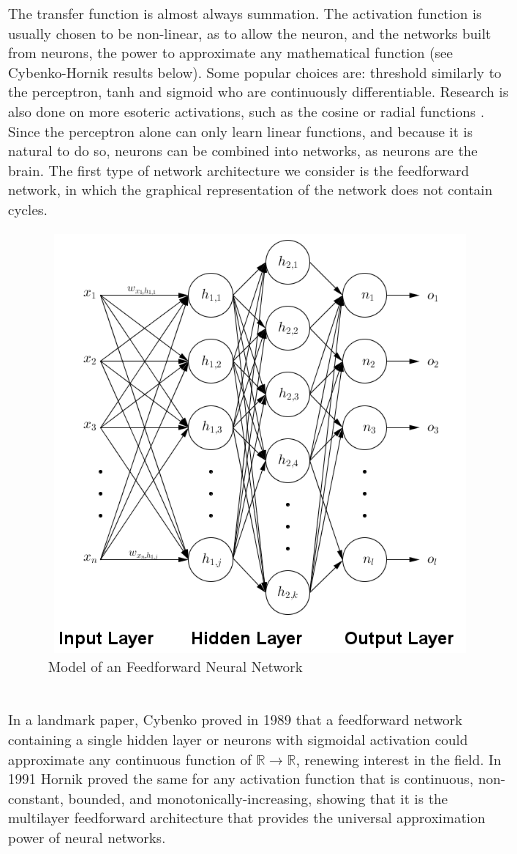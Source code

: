 \documentclass[12pt,oneside]{CUNY_CS_PhD}
\begin{document}
The transfer function is almost always summation. The activation function is usually chosen to be non-linear, as to allow the neuron, and the networks built from neurons, the power to approximate any mathematical function (see Cybenko-Hornik results below). Some popular choices  are: threshold similarly to the perceptron, tanh and sigmoid who are continuously differentiable.  Research is also done on more esoteric activations, such as the cosine or radial functions \cite{lee_cosine-modulated_1996}.\\
Since the perceptron alone can only learn linear functions, and because it is natural to do so, neurons can be combined into networks, as neurons are the brain. The first type of network architecture we consider is the feedforward network, in which the graphical representation of the network does not contain cycles.\\
\begin{figure}[h]
\centering
\includegraphics[keepaspectratio=false, height=11.09cm, width=12cm]{pictures/FeedForwardNeuralNetwork.png}
\caption{Model of an Feedforward Neural Network}
\label{fig:feedforward}
\end{figure}\\
In a landmark paper, Cybenko \cite{cybenko1989approximation} proved in 1989 that a feedforward network containing a single hidden layer or neurons with sigmoidal activation could approximate any continuous function of $\mathbb{R} \rightarrow \mathbb{R}$, renewing interest in the field. In 1991 Hornik \cite{Hornik:1991} proved the same for any activation function that is continuous, non-constant, bounded, and monotonically-increasing, showing that it is the multilayer feedforward architecture that provides the universal approximation power of neural networks.\\
\end{document}
